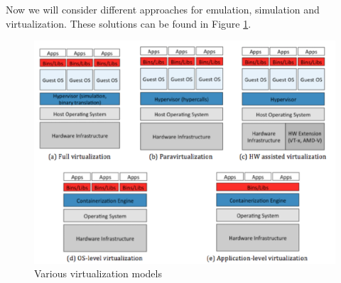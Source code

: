 Now we will consider different approaches for emulation, simulation and virtualization. These solutions can be found in Figure \ref{fig:virtualization-stacks}.
\begin{figure}
    \centering
    \includegraphics[scale=0.4]{img/virtualization_stacks.png}
    \caption{Various virtualization models}
    \label{fig:virtualization-stacks}
\end{figure}
